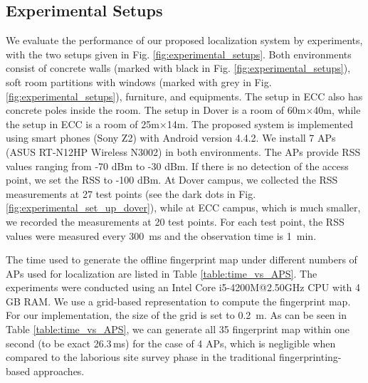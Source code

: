 \documentclass[10pt, conference, letterpaper]{IEEEtran}
\begin{document}
\subsection{Experimental Setups}
We evaluate the performance of our proposed localization system by experiments, with the two setups given in Fig. \ref{fig:experimental_setups}. 
Both environments consist of concrete walls (marked with black in Fig. \ref{fig:experimental_setups}), 
soft room partitions with windows (marked with grey in Fig. \ref{fig:experimental_setups}), furniture, and equipments. 
The setup in ECC also has concrete poles inside the room. 
The setup in Dover is a room of 60m$\times$40m, while the setup in ECC is a room of 25m$\times$14m. 
The proposed system is implemented using smart phones (Sony Z2) with Android version 4.4.2.
We install 7 APs (ASUS RT-N12HP Wireless N3002) in both environments. 
The APs provide RSS values ranging from -70 dBm to -30 dBm. 
If there is no detection of the access point, we set the RSS to -100 dBm. 
At Dover campus, we collected the RSS measurements at 27 test points (see the dark dots in Fig.\ref{fig:experimental_set_up_dover}), 
while at ECC campus, which is much smaller, we recorded the measurements at 20 test points. 
For each test point, the RSS values were measured every 300~ms and the observation time is 1~min.

The time used to generate the offline fingerprint map under different numbers of APs used for localization are listed in Table \ref{table:time_vs_APS}. 
The experiments were conducted using an Intel Core i5-4200M@2.50GHz CPU with 4 GB RAM.
We use a grid-based representation to compute the fingerprint map. 
For our implementation, the size of the grid is set to 0.2~m. 
As can be seen in Table \ref{table:time_vs_APS},
we can generate all 35 fingerprint map within one second (to be exact 26.3\,ms) for the case of 4 APs, 
which is negligible when compared to the laborious site survey phase in the traditional fingerprinting-based approaches.
\end{document}
